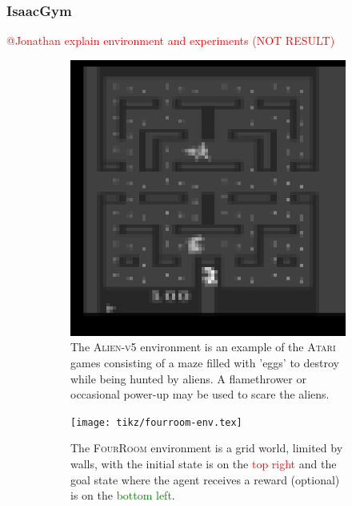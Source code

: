 \documentclass[10pt]{article} %
\begin{document}
\subsubsection{IsaacGym}
\textcolor{red}{@Jonathan explain environment and experiments (NOT RESULT)}

\begin{figure}
  \centering
  \begin{subfigure}[b]{0.32\textwidth}
    \centering
    \includegraphics[width=\textwidth]{figures/atari.png}
    \caption{The \textsc{Alien-v5} environment is an example of the \textsc{Atari} games consisting of a maze filled with 'eggs' to destroy while being hunted by aliens. A flamethrower or occasional power-up may be used to scare the aliens.}
    \label{fig:sample-env-atari}
  \end{subfigure}
  \hfill
  \begin{subfigure}[b]{0.32\textwidth}
    \centering
    \texttt{[image: tikz/fourroom-env.tex]}
    \caption{The \textsc{FourRoom} environment is a grid world, limited by walls, with the initial state is on the \textcolor{red}{top right} and the goal state where the agent receives a reward (optional) is on the \textcolor{green}{bottom left}.}
    \label{fig:sample-env-fourroom}
  \end{subfigure}
  \hfill
  \begin{subfigure}[b]{0.32\textwidth}

\end{subfigure}
\end{figure}
\end{document}
